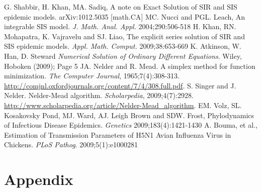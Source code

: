 \documentclass[11pt, a4paper, oneside,titlepage]{article}
\begin{document}
\begin{thebibliography}{1}
        G. Shabbir, H. Khan, MA. Sadiq, A note on Exact Solution of SIR and
        SIS epidemic models. arXiv:1012.5035 [math.CA]
        MC. Nucci and PGL. Leach, An integrable SIS model. \emph{J. Math. Anal. Appl.} 2004;290:506-518
        H. Khan, RN. Mohapatra, K. Vajravelu and SJ. Liao, The explicit
        series solution of SIR and SIS epidemic
        models. \emph{Appl. Math. Comput.} 2009;38:653-669
        K. Atkinson, W. Han, D. Steward \emph{Numerical Solution of
          Ordinary Different Equations}. Wiley, Hoboken (2009); Page 5
  JA. Nelder and R. Mead. A simplex method for function
  minimization. \emph{The Computer Journal},
  1965;7(4):308-313. \url{http://comjnl.oxfordjournals.org/content/7/4/308.full.pdf}.
  S. Singer and J. Nelder. Nelder-Mead algorithm. \emph{Scholarpedia},
  2009;4(7):2928.
  \url{http://www.scholarpedia.org/article/Nelder-Mead_algorithm}. 
  EM. Volz, SL. Kosakovsky Pond, MJ. Ward, AJ. Leigh Brown and
  SDW. Frost, Phylodynamics of Infectious Disease
  Epidemics. \emph{Genetics} 2009;183(4):1421-1430
  A. Bouma, et al., Estimation of Transmission Parameters of H5N1
  Avian Influenza Virus in Chickens. \emph{PLoS Pathog}. 2009;5(1):e1000281

\end{thebibliography}

\section*{Appendix}
\end{document}
